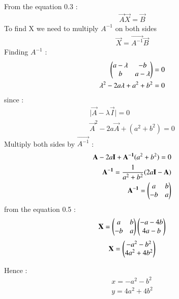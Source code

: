 \documentclass[journal]{IEEEtran}
\begin{document}
From the equation 0.3 :
\begin{align}
    \vec{A}\vec{X} = \vec{B}
\end{align}
To find X we need to multiply $A^{-1}$ on both sides
\begin{align}
   \vec{X} = \vec{A^{-1}}\vec{B}
\end{align}
Finding $A^{-1}$ :
\begin{align}
    \begin{pmatrix}a-\lambda & -b \\ b & a-\lambda\end{pmatrix} = 0\\
    \lambda^{2} - 2a\lambda + a^{2} + b^{2} = 0
\end{align}
since :
\begin{align}
    \lvert \vec{A}-\lambda\vec{I} \rvert = 0\\
    \vec{A}^{2} -2a\vec{A} +(a^{2}+b^{2}) =0
\end{align}
Multiply both sides by $\vec{A^{-1}}$ :
\begin{align}
    \mathbf{A} -2a\mathbf{I}+\mathbf{A^{-1}}(a^{2}+b^{2}) = 0\\
    \mathbf{A^{-1}} = \frac{1}{a^{2}+b^{2}} (2a\mathbf{I} - \mathbf{A})\\
    \mathbf{A^{-1}}= \begin{pmatrix}a & b \\ -b & a\end{pmatrix}
\end{align}
from the equation 0.5 :
\begin{align}
    \mathbf{X} = \begin{pmatrix}a & b \\ -b & a\end{pmatrix}\begin{pmatrix}-a-4b  \\ 4a -b\end{pmatrix} 
\end{align}
\begin{align}
   \mathbf{X} = \begin{pmatrix}-a^{2} -b^{2} \\ 4a^{2} + 4b^{2}\end{pmatrix}
\end{align}

Hence :
\begin{align*}
    x = -a^{2} -b^{2}\\
    y = 4a^{2} + 4b^{2}
\end{align*}
\end{document}
